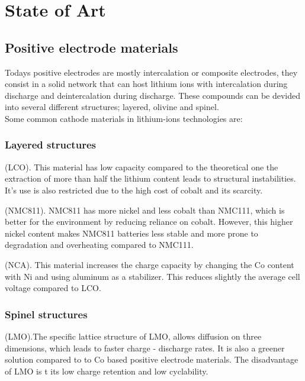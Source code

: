 \documentclass{article}
\begin{document}
\section{State of Art}

\subsection{Positive electrode materials}

Todays positive electrodes are mostly intercalation or composite electrodes, they consist in a solid network that can host lithium ions with intercalation during discharge and deintercalation during discharge.
These compounds can be devided into several different structures; layered, olivine and spinel. \cite{topo}  \\

Some common cathode materials in lithium-ions technologies are:
\begin{description}
 \subsubsection{Layered structures}
  \item[$\text{LiCoO}_{2}$]  (LCO). This material has low capacity compared to the theoretical one the extraction of more than half the lithium content leads to structural instabilities. It's use is also restricted due to the high cost of cobalt and its scarcity. \cite{topo}\cite{LCO}
 
  \item[$ \text{Li(Ni}_{0.8}\text{Co}_{0.1}\text{Mn}_{0.1}\text{)O}_{2} $]  (NMC811). NMC811 has more nickel and less cobalt than NMC111, which is better for the environment by reducing reliance on cobalt. However, this higher nickel content makes NMC811 batteries less stable and more prone to degradation and overheating compared to NMC111.\cite{topo}\cite{NMC811mat}
  

  \item[$\text{LiNi}_{0.8}\text{Co}_{0.15}\text{Al}_{0.05}\text{O}_{2}$] (NCA).
  This material increases the charge capacity by changing the Co content with Ni and using aluminum as 
  a stabilizer. This reduces slightly the average cell voltage
  compared to LCO.\cite{topo}\cite{NCA}
\end{description}

\begin{description}
 \subsubsection{Spinel structures}
  \item[$\text{LiMn}_{2}\text{O}_{4}$](LMO).The specific lattice structure
  of LMO, allows diffusion on three dimensions, which leads to faster charge
  - discharge rates. It is also a greener solution compared to to 
  Co based positive electrode materials. The disadvantage of LMO is t
its low charge retention and low cyclability.\cite{topo}\cite{LMO}
\end{description}
\end{document}

